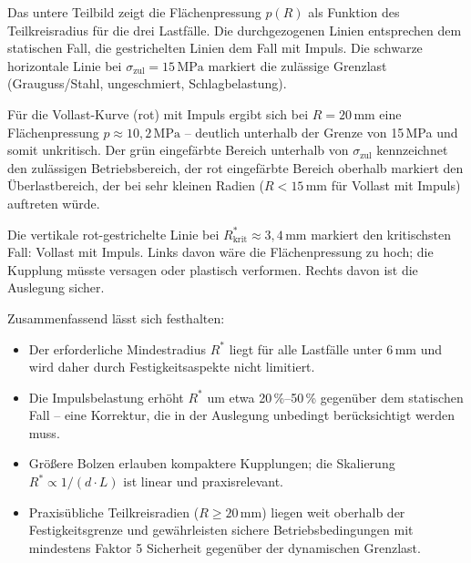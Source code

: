 ﻿\documentclass[a4paper,12pt]{article}
\begin{document}
Das untere Teilbild zeigt die Flächenpressung $p(R)$ als Funktion des
Teilkreisradius für die drei Lastfälle. Die durchgezogenen Linien entsprechen
dem statischen Fall, die gestrichelten Linien dem Fall mit Impuls. Die schwarze
horizontale Linie bei $\sigma_\text{zul} = 15\,\text{MPa}$ markiert die
zulässige Grenzlast (Grauguss/Stahl, ungeschmiert, Schlagbelastung).

Für die Vollast-Kurve (rot) mit Impuls ergibt sich bei $R = 20\,\text{mm}$
eine Flächenpressung $p \approx 10{,}2\,\text{MPa}$ -- deutlich unterhalb der
Grenze von 15\,MPa und somit unkritisch. Der grün eingefärbte Bereich unterhalb von
$\sigma_\text{zul}$ kennzeichnet den zulässigen Betriebsbereich, der rot
eingefärbte Bereich oberhalb markiert den Überlastbereich, der bei sehr
kleinen Radien ($R < 15\,\text{mm}$ für Vollast mit Impuls) auftreten würde.

Die vertikale rot-gestrichelte Linie bei $R^*_\text{krit} \approx 3{,}4\,\text{mm}$
markiert den kritischsten Fall: Vollast mit Impuls. Links davon wäre die
Flächenpressung zu hoch; die Kupplung müsste versagen oder plastisch verformen.
Rechts davon ist die Auslegung sicher.

Zusammenfassend lässt sich festhalten:

\begin{itemize}
  \item Der erforderliche Mindestradius $R^*$ liegt für alle Lastfälle
    unter $6\,\text{mm}$ und wird daher durch Festigkeitsaspekte nicht limitiert.
  \item Die Impulsbelastung erhöht $R^*$ um etwa 20\,\%--50\,\% gegenüber
    dem statischen Fall -- eine Korrektur, die in der Auslegung unbedingt
    berücksichtigt werden muss.
  \item Größere Bolzen erlauben kompaktere Kupplungen; die Skalierung
    $R^* \propto 1/(d \cdot L)$ ist linear und praxisrelevant.
  \item Praxisübliche Teilkreisradien ($R \geq 20\,\text{mm}$) liegen
    weit oberhalb der Festigkeitsgrenze und gewährleisten sichere Betriebsbedingungen
    mit mindestens Faktor 5 Sicherheit gegenüber der dynamischen Grenzlast.
\end{itemize}
\end{document}
